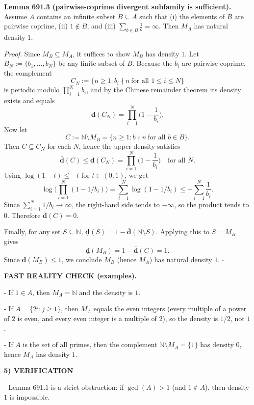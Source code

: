 \medskip
\noindent\textbf{Lemma 691.3 (pairwise-coprime divergent subfamily is sufficient).}
Assume $A$ contains an infinite subset $B\subseteq A$ such that (i) the elements of $B$ are pairwise coprime, (ii) $1\notin B$, and (iii) $\sum_{b\in B} \frac{1}{b}=\infty$. Then $M_A$ has natural density $1$.

\smallskip
\noindent\emph{Proof.}
Since $M_B\subseteq M_A$, it suffices to show $M_B$ has density $1$. Let $B_N:=\{b_1,\dots,b_N\}$ be any finite subset of $B$. Because the $b_i$ are pairwise coprime, the complement
\[
C_N:=\{n\ge 1: b_i\nmid n\ \text{for all }1\le i\le N\}
\]
is periodic modulo $\prod_{i=1}^N b_i$, and by the Chinese remainder theorem its density exists and equals
\[
\mathbf{d}(C_N)=\prod_{i=1}^N \Big(1-\frac{1}{b_i}\Big).
\]
Now let
\[
C:=\mathbb{N}\setminus M_B=\{n\ge 1: b\nmid n\ \text{for all }b\in B\}.
\]
Then $C\subseteq C_N$ for each $N$, hence the upper density satisfies
\[
\overline{\mathbf{d}}(C)\le \mathbf{d}(C_N)=\prod_{i=1}^N \Big(1-\frac{1}{b_i}\Big)
\quad\text{for all }N.
\]
Using $\log(1-t)\le -t$ for $t\in(0,1)$, we get
\[
\log\Big(\prod_{i=1}^N (1-1/b_i)\Big)=\sum_{i=1}^N \log(1-1/b_i)\le -\sum_{i=1}^N \frac{1}{b_i}.
\]
Since $\sum_{i=1}^N 1/b_i\to\infty$, the right-hand side tends to $-\infty$, so the product tends to $0$. Therefore $\overline{\mathbf{d}}(C)=0$.

Finally, for any set $S\subseteq\mathbb{N}$, $\underline{\mathbf{d}}(S)=1-\overline{\mathbf{d}}(\mathbb{N}\setminus S)$. Applying this to $S=M_B$ gives
\[
\underline{\mathbf{d}}(M_B)=1-\overline{\mathbf{d}}(C)=1.
\]
Since $\overline{\mathbf{d}}(M_B)\le 1$, we conclude $M_B$ (hence $M_A$) has natural density $1$. \hfill$\square$

\medskip
\noindent\textbf{FAST REALITY CHECK (examples).}

- If $1\in A$, then $M_A=\mathbb{N}$ and the density is $1$.

- If $A=\{2^j:j\ge 1\}$, then $M_A$ equals the even integers (every multiple of a power of $2$ is even, and every even integer is a multiple of $2$), so the density is $1/2$, not $1$.

- If $A$ is the set of all primes, then the complement $\mathbb{N}\setminus M_A=\{1\}$ has density $0$, hence $M_A$ has density $1$.

\bigskip
\noindent\textbf{5) VERIFICATION}

- Lemma 691.1 is a strict obstruction: if $\gcd(A)>1$ (and $1\notin A$), then density $1$ is impossible.

